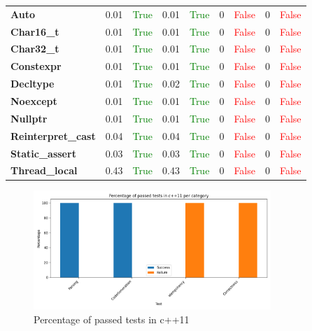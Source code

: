 \documentclass{article}
\begin{document}
\begin{xltabular}{\textwidth}{lcccccccc}
\textbf{{\fontsize{10}{12}\selectfont Auto}}& 0.01&\textcolor{green}{True}& 0.01&\textcolor{green}{True}& 0&\textcolor{red}{False}& 0&\textcolor{red}{False} \\[0.5ex]
\textbf{{\fontsize{10}{12}\selectfont Char16\_t}}& 0.01&\textcolor{green}{True}& 0.01&\textcolor{green}{True}& 0&\textcolor{red}{False}& 0&\textcolor{red}{False} \\[0.5ex]
\textbf{{\fontsize{10}{12}\selectfont Char32\_t}}& 0.01&\textcolor{green}{True}& 0.01&\textcolor{green}{True}& 0&\textcolor{red}{False}& 0&\textcolor{red}{False} \\[0.5ex]
\textbf{{\fontsize{10}{12}\selectfont Constexpr}}& 0.01&\textcolor{green}{True}& 0.01&\textcolor{green}{True}& 0&\textcolor{red}{False}& 0&\textcolor{red}{False} \\[0.5ex]
\textbf{{\fontsize{10}{12}\selectfont Decltype}}& 0.01&\textcolor{green}{True}& 0.02&\textcolor{green}{True}& 0&\textcolor{red}{False}& 0&\textcolor{red}{False} \\[0.5ex]
\textbf{{\fontsize{10}{12}\selectfont Noexcept}}& 0.01&\textcolor{green}{True}& 0.01&\textcolor{green}{True}& 0&\textcolor{red}{False}& 0&\textcolor{red}{False} \\[0.5ex]
\textbf{{\fontsize{10}{12}\selectfont Nullptr}}& 0.01&\textcolor{green}{True}& 0.01&\textcolor{green}{True}& 0&\textcolor{red}{False}& 0&\textcolor{red}{False} \\[0.5ex]
\textbf{{\fontsize{10}{12}\selectfont Reinterpret\_cast}}& 0.04&\textcolor{green}{True}& 0.04&\textcolor{green}{True}& 0&\textcolor{red}{False}& 0&\textcolor{red}{False} \\[0.5ex]
\textbf{{\fontsize{10}{12}\selectfont Static\_assert}}& 0.03&\textcolor{green}{True}& 0.03&\textcolor{green}{True}& 0&\textcolor{red}{False}& 0&\textcolor{red}{False} \\[0.5ex]
\textbf{{\fontsize{10}{12}\selectfont Thread\_local}}& 0.43&\textcolor{green}{True}& 0.43&\textcolor{green}{True}& 0&\textcolor{red}{False}& 0&\textcolor{red}{False} \\[0.5ex]
\bottomrule
\end{xltabular}
\newpage
\begin{figure}[h!]
\centering
\includegraphics[width=0.8\textwidth]{../reports/artisan/images/c++11_percentage.png}
\caption{Percentage of passed tests in c++11}
\label{fig:c++11_percentage}
\end{figure}
\newpage
\end{document}
